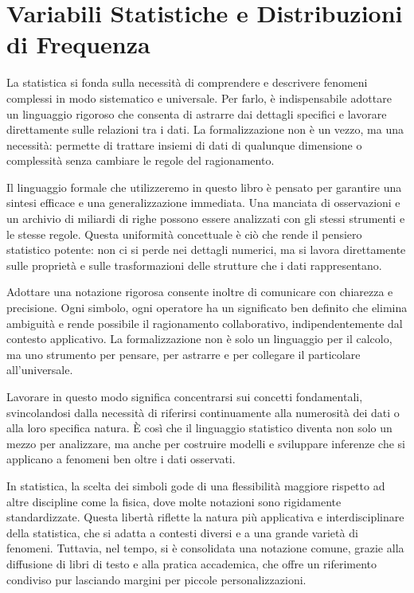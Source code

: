\documentclass[
  11pt,
]{book}
\theoremstyle{mytheoremstyle}
\theoremstyle{mydefstyle}
\begin{document}
\chapter{Variabili Statistiche e Distribuzioni di Frequenza}\label{variabili-statistiche-e-distribuzioni-di-frequenza}

La statistica si fonda sulla necessità di comprendere e descrivere fenomeni complessi in modo sistematico e universale. Per farlo, è indispensabile adottare un linguaggio rigoroso che consenta di astrarre dai dettagli specifici e lavorare direttamente sulle relazioni tra i dati. La formalizzazione non è un vezzo, ma una necessità: permette di trattare insiemi di dati di qualunque dimensione o complessità senza cambiare le regole del ragionamento.

Il linguaggio formale che utilizzeremo in questo libro è pensato per garantire una sintesi efficace e una generalizzazione immediata. Una manciata di osservazioni e un archivio di miliardi di righe possono essere analizzati con gli stessi strumenti e le stesse regole. Questa uniformità concettuale è ciò che rende il pensiero statistico potente: non ci si perde nei dettagli numerici, ma si lavora direttamente sulle proprietà e sulle trasformazioni delle strutture che i dati rappresentano.

Adottare una notazione rigorosa consente inoltre di comunicare con chiarezza e precisione. Ogni simbolo, ogni operatore ha un significato ben definito che elimina ambiguità e rende possibile il ragionamento collaborativo, indipendentemente dal contesto applicativo. La formalizzazione non è solo un linguaggio per il calcolo, ma uno strumento per pensare, per astrarre e per collegare il particolare all'universale.

Lavorare in questo modo significa concentrarsi sui concetti fondamentali, svincolandosi dalla necessità di riferirsi continuamente alla numerosità dei dati o alla loro specifica natura. È così che il linguaggio statistico diventa non solo un mezzo per analizzare, ma anche per costruire modelli e sviluppare inferenze che si applicano a fenomeni ben oltre i dati osservati.

In statistica, la scelta dei simboli gode di una flessibilità maggiore rispetto ad altre discipline come la fisica, dove molte notazioni sono rigidamente standardizzate. Questa libertà riflette la natura più applicativa e interdisciplinare della statistica, che si adatta a contesti diversi e a una grande varietà di fenomeni. Tuttavia, nel tempo, si è consolidata una notazione comune, grazie alla diffusione di libri di testo e alla pratica accademica, che offre un riferimento condiviso pur lasciando margini per piccole personalizzazioni.
\end{document}
